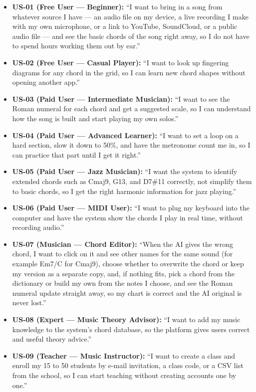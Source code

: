 \documentclass[a4paper]{article}
\begin{document}
\begin{itemize}
    \item \textbf{US-01 (Free User --- Beginner):} ``I want to bring in a song from whatever source I have --- an audio file on my device, a live recording I make with my own microphone, or a link to YouTube, SoundCloud, or a public audio file --- and see the basic chords of the song right away, so I do not have to spend hours working them out by ear.''
    \item \textbf{US-02 (Free User --- Casual Player):} ``I want to look up fingering diagrams for any chord in the grid, so I can learn new chord shapes without opening another app.''
    \item \textbf{US-03 (Paid User --- Intermediate Musician):} ``I want to see the Roman numeral for each chord and get a suggested scale, so I can understand how the song is built and start playing my own solos.''
    \item \textbf{US-04 (Paid User --- Advanced Learner):} ``I want to set a loop on a hard section, slow it down to 50\%, and have the metronome count me in, so I can practice that part until I get it right.''
    \item \textbf{US-05 (Paid User --- Jazz Musician):} ``I want the system to identify extended chords such as Cmaj9, G13, and D7\#11 correctly, not simplify them to basic chords, so I get the right harmonic information for jazz playing.''
    \item \textbf{US-06 (Paid User --- MIDI User):} ``I want to plug my keyboard into the computer and have the system show the chords I play in real time, without recording audio.''
    \item \textbf{US-07 (Musician --- Chord Editor):} ``When the AI gives the wrong chord, I want to click on it and see other names for the same sound (for example Em7/C for Cmaj9), choose whether to overwrite the chord or keep my version as a separate copy, and, if nothing fits, pick a chord from the dictionary or build my own from the notes I choose, and see the Roman numeral update straight away, so my chart is correct and the AI original is never lost.''
    \item \textbf{US-08 (Expert --- Music Theory Advisor):} ``I want to add my music knowledge to the system's chord database, so the platform gives users correct and useful theory advice.''
    \item \textbf{US-09 (Teacher --- Music Instructor):} ``I want to create a class and enroll my 15 to 50 students by e-mail invitation, a class code, or a CSV list from the school, so I can start teaching without creating accounts one by one.''

\end{itemize}
\end{document}
